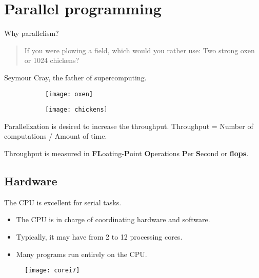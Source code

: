 \documentclass[xcolor={dvipsnames}]{beamer}
\begin{document}
\section{Parallel programming}

\begin{frame}[fragile]{Why parallelism?}{}
\begin{quote}
If you were plowing a field, which would you rather use: Two strong oxen or 1024 chickens?
\end{quote}
Seymour Cray, the father of supercomputing.

\vfill
\begin{figure}[H]
\centering
\begin{subfigure}{.4\textwidth}
	\centering
	\texttt{[image: oxen]}
\end{subfigure}
\begin{subfigure}{.4\textwidth}
	\centering
	\texttt{[image: chickens]}
\end{subfigure}
\label{fig:cray}
\end{figure}

\end{frame}


\begin{frame}[fragile]{Parallelization is desired to increase the throughput.}{}
Throughput = Number of computations / Amount of time.

\pause
\bigskip
Throughput is measured in \textbf{FL}oating-\textbf{P}oint \textbf{O}perations \textbf{P}er \textbf{S}econd or \textbf{flops}.
\end{frame}


\subsection{Hardware}
\begin{frame}{The CPU is excellent for serial tasks.}

\begin{itemize}[<+->]
\item The CPU is in charge of coordinating hardware and software.
\bigskip
\item Typically, it may have from 2 to 12 processing cores.
\bigskip
\item Many programs run entirely on the CPU. 
\end{itemize}

\begin{figure}
\centering
\texttt{[image: corei7]}
\label{fig:corei7}
\end{figure}
\end{frame}
\end{document}
